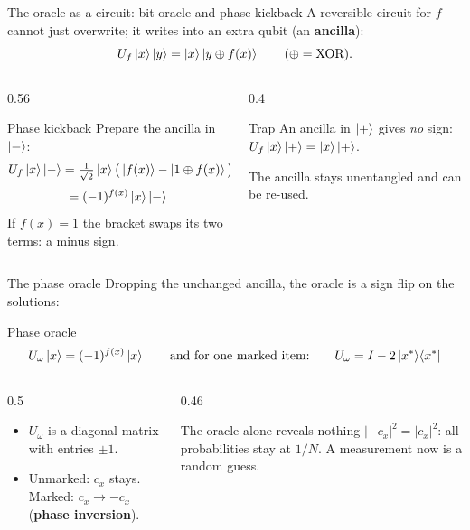 \documentclass[aspectratio=169,11pt]{beamer}
\newcommand{\key}[1]{{\color{qdark}\textbf{#1}}}
\newcommand{\xs}{x^\ast}
\newcommand{\Uo}{U_\omega}
\newcommand{\pj}[1]{\ket{#1}\!\bra{#1}}
\begin{document}
\begin{frame}{The oracle as a circuit: bit oracle and phase kickback}
  A reversible circuit for $f$ cannot just overwrite; it writes into an extra qubit (an \key{ancilla}):
  \[ U_f\ket{x}\ket{y} = \ket{x}\ket{y \oplus f(x)} \qquad (\oplus = \text{XOR}). \]
  \begin{columns}[T]
    \begin{column}{0.56\textwidth}
      \begin{block}{Phase kickback}
        Prepare the ancilla in $\ket{-}$:
        \[ U_f\ket{x}\ket{-} = \tfrac{1}{\sqrt2}\ket{x}\big(\ket{f(x)} - \ket{1 \oplus f(x)}\big) \]
        \[ = (-1)^{f(x)}\ket{x}\ket{-} \]
        If $f(x) = 1$ the bracket swaps its two terms: a minus sign.
      \end{block}
    \end{column}
    \begin{column}{0.4\textwidth}
      \begin{alertblock}{Trap}
        An ancilla in $\ket{+}$ gives \emph{no} sign: $U_f\ket{x}\ket{+} = \ket{x}\ket{+}$.
      \end{alertblock}
      \small The ancilla stays unentangled and can be re-used.
    \end{column}
  \end{columns}
\end{frame}

\begin{frame}{The phase oracle}
  Dropping the unchanged ancilla, the oracle is a sign flip on the solutions:
  \begin{block}{Phase oracle}
    \[ \Uo\ket{x} = (-1)^{f(x)}\ket{x} \qquad\text{and for one marked item:}\qquad \Uo = I - 2\pj{\xs} \]
  \end{block}
  \begin{columns}[T]
    \begin{column}{0.5\textwidth}
      \begin{itemize}
        \item $\Uo$ is a diagonal matrix with entries $\pm1$.
        \item Unmarked: $c_x$ stays. Marked: $c_x \to -c_x$ (\key{phase inversion}).
      \end{itemize}
    \end{column}
    \begin{column}{0.46\textwidth}
      \begin{alertblock}{The oracle alone reveals nothing}
        $|-c_x|^2 = |c_x|^2$: all probabilities stay at $1/N$. A measurement now is a random guess.
      \end{alertblock}
    \end{column}
  \end{columns}
\end{frame}
\end{document}
